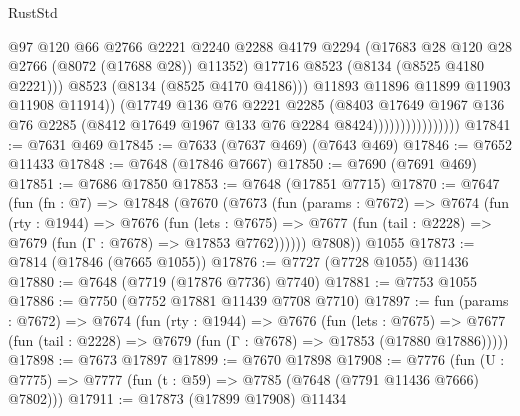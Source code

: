 \begin{lexlean}{RustStd}
\begin{coremodule}
{\begin{coremodule}
{{{{{{{{{{{{{{{{{{{{{{{{{{{{{{{{{{{{{{{{{{{{{{{{{{{{{                                      @97
                                      @120
                                      @66
                                      @2766
                                      @2221
                                      @2240
                                      @2288
                                      @4179
                                      @2294
                                      (@17683 @28 @120 @28 @2766 (@8072 (@17688 @28)) @11352)
                                      @17716
                                      @8523
                                      (@8134 (@8525 @4180 @2221)))
                                    @8523
                                    (@8134 (@8525 @4170 @4186)))
                                  @11893
                                  @11896
                                  @11899
                                  @11903
                                  @11908
                                  @11914))
                              (@17749
                                @136
                                @76
                                @2221
                                @2285
                                (@8403
                                  @17649
                                  @1967
                                  @136
                                  @76
                                  @2285
                                  (@8412 @17649 @1967 @133 @76 @2284 @8424))))))))))))))))
@17841 := @7631 @469
@17845 := @7633 (@7637 @469) (@7643 @469)
@17846 := @7652 @11433
@17848 := @7648 (@17846 @7667)
@17850 := @7690 (@7691 @469)
@17851 := @7686 @17850
@17853 := @7648 (@17851 @7715)
@17870 := @7647
    (fun (fn : @7) =>
    @17848
      (@7670
        (@7673
          (fun (params : @7672) =>
          @7674
            (fun (rty : @1944) =>
            @7676
              (fun (lets : @7675) =>
              @7677 (fun (tail : @2228) => @7679 (fun (Γ : @7678) => @17853 @7762))))))
        @7808))
    @1055
@17873 := @7814 (@17846 (@7665 @1055))
@17876 := @7727 (@7728 @1055) @11436
@17880 := @7648 (@7719 (@17876 @7736) @7740)
@17881 := @7753 @1055
@17886 := @7750 (@7752 @17881 @11439 @7708 @7710)
@17897 := fun (params : @7672) =>
  @7674
    (fun (rty : @1944) =>
    @7676
      (fun (lets : @7675) =>
      @7677 (fun (tail : @2228) => @7679 (fun (Γ : @7678) => @17853 (@17880 @17886)))))
@17898 := @7673 @17897
@17899 := @7670 @17898
@17908 := @7776
    (fun (U : @7775) => @7777 (fun (t : @59) => @7785 (@7648 (@7791 @11436 @7666) @7802)))
@17911 := @17873 (@17899 @17908) @11434
}}}}}}}}}}}}}}}}}}}}}}}}}}}}}}}}}}}}}}}}}}}}}}}}}}}}}
\end{coremodule}}
\end{coremodule}
\end{lexlean}
